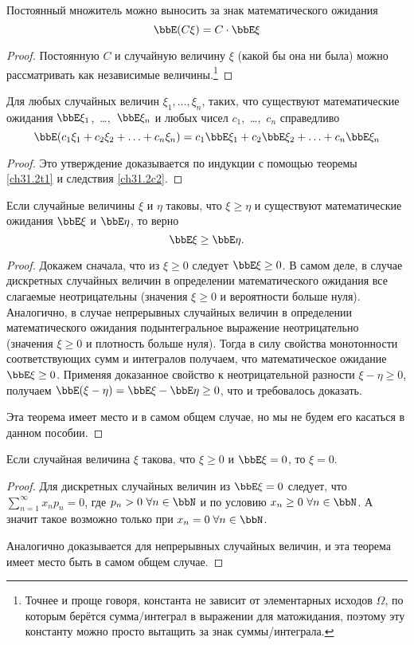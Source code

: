 \begin{cons}\label{ch31.2c2}
Постоянный множитель можно выносить за знак математического ожидания
$$
\bbE(C\xi)=C\cdot \bbE\xi
$$
\end{cons}
\begin{proof}
Постоянную $C$ и случайную величину $\xi$ (какой бы она ни была) можно рассматривать как независимые величины.\footnote{Точнее и проще говоря, константа не зависит от элементарных исходов $\Omega$, по которым берётся сумма/интеграл в выражении для матожидания, поэтому эту константу можно просто вытащить за знак суммы/интеграла.}
\end{proof}
\begin{cons}[линейность] Для любых случайных величин $\xi_1,\dots,\xi_n$, таких, что существуют математические ожидания $\bbE\xi_1$,~\dots,~$\bbE\xi_n$ и любых чисел $c_1$,~\dots,~$c_n$ справедливо
$$
\bbE(c_1\xi_1+c_2\xi_2+\ldots+c_n\xi_n) = c_1\bbE\xi_1+c_2\bbE\xi_2+\ldots+c_n\bbE\xi_n
$$
\end{cons}
\begin{proof} Это утверждение доказывается по индукции с помощью теоремы \ref{ch31.2t1} и следствия \ref{ch31.2c2}.
\end{proof}
\begin{thm}[монотонность] \label{ch31.2t4}
Если случайные величины $\xi$ и $\eta$ таковы, что $\xi \ge\eta$ и существуют математические ожидания $\bbE\xi$ и $\bbE\eta$, то верно
$$
\bbE\xi\ge \bbE\eta.
$$
\end{thm}
\begin{proof}
Докажем сначала, что из $\xi\ge 0$ следует $\bbE\xi\ge0$. В самом деле, в случае дискретных случайных величин в определении математического ожидания все слагаемые неотрицательны (значения $\xi \ge 0$ и вероятности больше нуля). Аналогично, в случае непрерывных случайных величин в определении математического ожидания подынтегральное выражение неотрицательно (значения $\xi \ge 0$ и плотность больше нуля). Тогда в силу свойства монотонности соответствующих сумм и интегралов получаем, что математическое ожидание $\bbE\xi \ge 0$. Применяя доказанное свойство к неотрицательной разности $\xi-\eta \ge 0$, получаем $\bbE(\xi-\eta)=\bbE\xi-\bbE\eta\ge0$, что и требовалось доказать.

Эта теорема имеет место и в самом общем случае, но мы не будем его касаться в данном пособии.
\end{proof}
\begin{thm}\label{ch31.2t3}
Если случайная величина $\xi$ такова, что $\xi\ge 0$ и $\bbE\xi=0$, то $\xi=0$.
\end{thm}
\begin{proof}
Для дискретных случайных величин из $\bbE\xi=0$ следует, что $\sum\limits_{n=1}^{\infty} x_n p_n = 0$, где $p_n > 0 \ \forall n\in \bbN$ и по условию $x_n \ge 0 \ \forall n\in \bbN$. А значит такое возможно только при $x_n = 0 \; \forall n\in \bbN$.

Аналогично доказывается для непрерывных случайных величин, и эта теорема имеет место быть в самом общем случае.
\end{proof}

